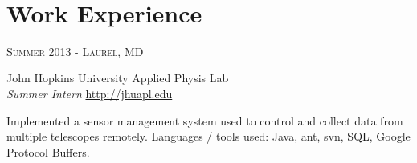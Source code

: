 \documentclass[10pt]{article} %
\begin{document}
\color{text1} %


\par{\\ %
	

\begin{minipage}[t]{0.5\textwidth} %
\vspace{0pt} %
	

\section{Work Experience} 


{\raggedleft\textsc{Summer 2013 - Laurel, MD}\par}

{\raggedright\large John Hopkins University Applied Physis Lab \\
\textit{Summer Intern}  \hfill {\small \href{http://jhuapl.edu}{http://jhuapl.edu}}\\ [5pt]}

\normalsize{Implemented a sensor management system used to control and collect data from multiple telescopes remotely. Languages / tools used: Java, ant, svn, SQL, Google Protocol Buffers.}\\



\end{minipage}}
\end{document}

